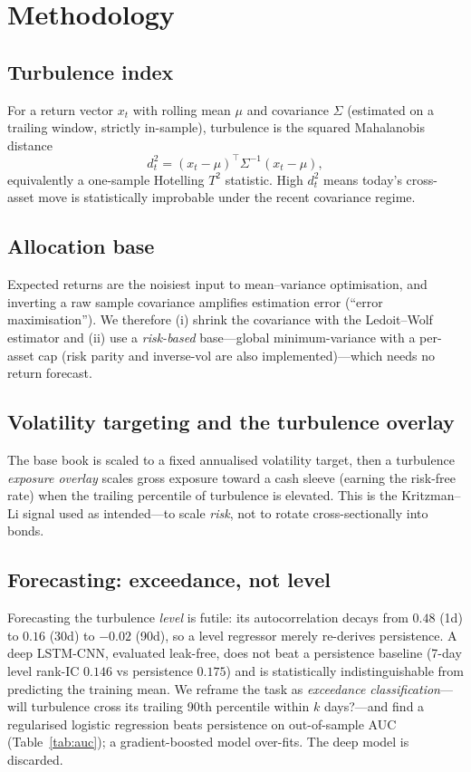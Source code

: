 \documentclass[11pt]{article}
\begin{document}
\section{Methodology}
\subsection{Turbulence index}
For a return vector $x_t$ with rolling mean $\mu$ and covariance $\Sigma$ (estimated on a trailing
window, strictly in-sample), turbulence is the squared Mahalanobis distance
\begin{equation}
d_t^2 = (x_t-\mu)^\top \Sigma^{-1} (x_t-\mu),
\end{equation}
equivalently a one-sample Hotelling $T^2$ statistic. High $d_t^2$ means today's cross-asset move is
statistically improbable under the recent covariance regime.

\subsection{Allocation base}
Expected returns are the noisiest input to mean--variance optimisation, and inverting a raw sample
covariance amplifies estimation error (``error maximisation''). We therefore (i) shrink the
covariance with the Ledoit--Wolf estimator and (ii) use a \emph{risk-based} base---global
minimum-variance with a per-asset cap (risk parity and inverse-vol are also implemented)---which
needs no return forecast.

\subsection{Volatility targeting and the turbulence overlay}
The base book is scaled to a fixed annualised volatility target, then a turbulence \emph{exposure
overlay} scales gross exposure toward a cash sleeve (earning the risk-free rate) when the trailing
percentile of turbulence is elevated. This is the Kritzman--Li signal used as intended---to scale
\emph{risk}, not to rotate cross-sectionally into bonds.

\subsection{Forecasting: exceedance, not level}
Forecasting the turbulence \emph{level} is futile: its autocorrelation decays from $0.48$ (1d) to
$0.16$ (30d) to $-0.02$ (90d), so a level regressor merely re-derives persistence. A deep LSTM-CNN,
evaluated leak-free, does not beat a persistence baseline (7-day level rank-IC $0.146$ vs
persistence $0.175$) and is statistically indistinguishable from predicting the training mean. We
reframe the task as \emph{exceedance classification}---will turbulence cross its trailing 90th
percentile within $k$ days?---and find a regularised logistic regression beats persistence on
out-of-sample AUC (Table~\ref{tab:auc}); a gradient-boosted model over-fits. The deep model is
discarded.
\end{document}
